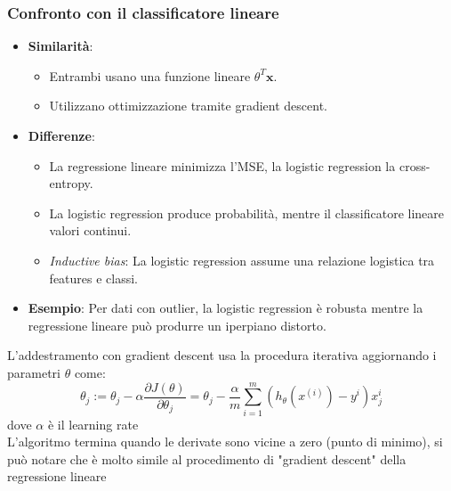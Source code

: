 \documentclass[10pt,oneside,a4paper]{article}
\begin{document}
	\subsubsection{Confronto con il classificatore lineare}
	\begin{itemize}
		\item \textbf{Similarità}:
		\begin{itemize}
			\item Entrambi usano una funzione lineare $\theta^T \mathbf{x}$.
			\item Utilizzano ottimizzazione tramite gradient descent.
		\end{itemize}
		\item \textbf{Differenze}:
		\begin{itemize}
			\item La regressione lineare minimizza l'MSE, la logistic regression la cross-entropy.
			\item La logistic regression produce probabilità, mentre il classificatore lineare valori continui.
			\item \textit{Inductive bias}: La logistic regression assume una relazione logistica tra features e classi.
		\end{itemize}
		\item \textbf{Esempio}: Per dati con outlier, la logistic regression è robusta mentre la regressione lineare può produrre un iperpiano distorto.
	\end{itemize}
	
	L'addestramento con gradient descent usa la procedura iterativa aggiornando i parametri $\theta$ come:
	\[
	\theta_j := \theta_j - \alpha \frac{\partial J(\theta)}{\partial \theta_j} = \theta_j - \frac{\alpha}{m} \sum_{i=1}^{m} (h_{\theta}(x^{(i)}) - y^i)x_j^i
	\]
	dove $\alpha$ è il learning rate\\
	L'algoritmo termina quando le derivate sono vicine a zero (punto di minimo), si può notare che è molto simile al procedimento di "gradient descent" della regressione lineare
	
	
	
\end{document}
